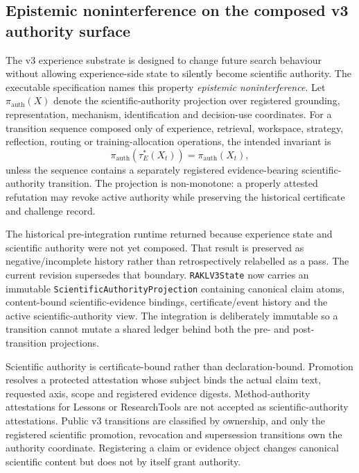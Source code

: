 \subsection{Epistemic noninterference on the composed v3 authority surface}

The v3 experience substrate is designed to change future search behaviour without allowing experience-side state to silently become scientific authority.  The executable specification names this property \emph{epistemic noninterference}.  Let $\pi_{\mathrm{auth}}(X)$ denote the scientific-authority projection over registered grounding, representation, mechanism, identification and decision-use coordinates.  For a transition sequence composed only of experience, retrieval, workspace, strategy, reflection, routing or training-allocation operations, the intended invariant is
\[
\pi_{\mathrm{auth}}(\tau_E^*(X_t))=\pi_{\mathrm{auth}}(X_t),
\]
unless the sequence contains a separately registered evidence-bearing scientific-authority transition.  The projection is non-monotone: a properly attested refutation may revoke active authority while preserving the historical certificate and challenge record.

The historical pre-integration runtime returned  because experience state and scientific authority were not yet composed.  That result is preserved as negative/incomplete history rather than retrospectively relabelled as a pass.  The current revision supersedes that boundary.  \texttt{RAKLV3State} now carries an immutable \texttt{ScientificAuthorityProjection} containing canonical claim atoms, content-bound scientific-evidence bindings, certificate/event history and the active scientific-authority view.  The integration is deliberately immutable so a transition cannot mutate a shared ledger behind both the pre- and post-transition projections.

Scientific authority is certificate-bound rather than declaration-bound.  Promotion resolves a protected attestation whose subject binds the actual claim text, requested axis, scope and registered evidence digests.  Method-authority attestations for Lessons or ResearchTools are not accepted as scientific-authority attestations.  Public v3 transitions are classified by ownership, and only the registered scientific promotion, revocation and supersession transitions own the authority coordinate.  Registering a claim or evidence object changes canonical scientific content but does not by itself grant authority.

